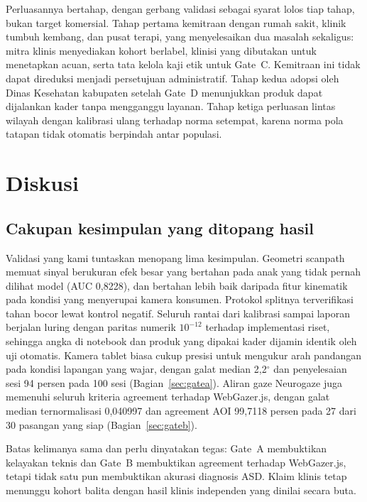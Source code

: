 \documentclass{article}
\begin{document}
Perluasannya bertahap, dengan gerbang validasi sebagai syarat lolos tiap tahap, bukan target
komersial. Tahap pertama kemitraan dengan rumah sakit, klinik tumbuh kembang, dan pusat
terapi, yang menyelesaikan dua masalah sekaligus: mitra klinis menyediakan kohort berlabel,
klinisi yang dibutakan untuk menetapkan acuan, serta tata kelola kaji etik untuk Gate~C.
Kemitraan ini tidak dapat direduksi menjadi persetujuan administratif. Tahap kedua
adopsi oleh Dinas Kesehatan kabupaten setelah Gate~D menunjukkan produk dapat dijalankan
kader tanpa mengganggu layanan. Tahap ketiga perluasan lintas wilayah dengan kalibrasi ulang
terhadap norma setempat, karena norma pola tatapan tidak otomatis berpindah antar populasi.

\section{Diskusi}

\subsection{Cakupan kesimpulan yang ditopang hasil}

Validasi yang kami tuntaskan menopang lima kesimpulan. Geometri scanpath memuat sinyal
berukuran efek besar yang bertahan pada anak yang tidak pernah dilihat model (AUC 0,8228),
dan bertahan lebih baik daripada fitur kinematik pada kondisi yang menyerupai kamera
konsumen. Protokol splitnya terverifikasi tahan bocor lewat kontrol negatif. Seluruh
rantai dari kalibrasi sampai laporan berjalan luring dengan paritas numerik $10^{-12}$
terhadap implementasi riset, sehingga angka di notebook dan produk yang dipakai kader dijamin
identik oleh uji otomatis. Kamera tablet biasa cukup presisi untuk mengukur arah pandangan
pada kondisi lapangan yang wajar, dengan galat median 2,2$^\circ$ dan penyelesaian sesi 94
persen pada 100 sesi (Bagian~\ref{sec:gatea}). Aliran gaze Neurogaze juga memenuhi seluruh
kriteria agreement terhadap WebGazer.js, dengan galat median ternormalisasi 0,040997 dan
agreement AOI 99,7118 persen pada 27 dari 30 pasangan yang siap (Bagian~\ref{sec:gateb}).

Batas kelimanya sama dan perlu dinyatakan tegas: Gate~A membuktikan kelayakan teknis dan
Gate~B membuktikan agreement terhadap WebGazer.js, tetapi tidak satu pun membuktikan akurasi diagnosis
ASD. Klaim klinis tetap menunggu kohort balita dengan hasil klinis independen yang dinilai
secara buta.
\end{document}
